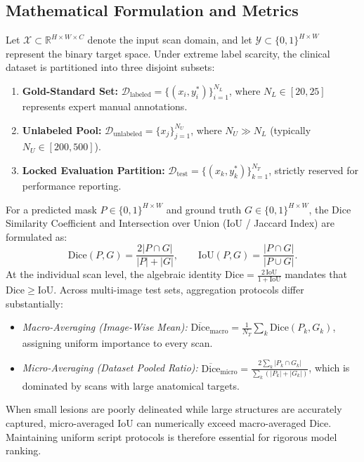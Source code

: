 \documentclass[journal,11pt,onecolumn,draftclsnofoot]{IEEEtran}
\begin{document}
\subsection{Mathematical Formulation and Metrics}
\label{subsec:metrics}
Let $\mathcal{X} \subset \mathbb{R}^{H \times W \times C}$ denote the input scan domain, and let $\mathcal{Y} \subset \{0, 1\}^{H \times W}$ represent the binary target space. Under extreme label scarcity, the clinical dataset is partitioned into three disjoint subsets:
\begin{enumerate}
    \item \textbf{Gold-Standard Set:} $\mathcal{D}_{\text{labeled}} = \{(x_i, y_i^*)\}_{i=1}^{N_L}$, where $N_L \in [20, 25]$ represents expert manual annotations.
    \item \textbf{Unlabeled Pool:} $\mathcal{D}_{\text{unlabeled}} = \{x_j\}_{j=1}^{N_U}$, where $N_U \gg N_L$ (typically $N_U \in [200, 500]$).
    \item \textbf{Locked Evaluation Partition:} $\mathcal{D}_{\text{test}} = \{(x_k, y_k^*)\}_{k=1}^{N_T}$, strictly reserved for performance reporting.
\end{enumerate}

For a predicted mask $P \in \{0, 1\}^{H \times W}$ and ground truth $G \in \{0, 1\}^{H \times W}$, the Dice Similarity Coefficient and Intersection over Union (IoU / Jaccard Index) are formulated as:
\begin{equation}
\mathrm{Dice}(P, G) = \frac{2|P \cap G|}{|P| + |G|}, \qquad \mathrm{IoU}(P, G) = \frac{|P \cap G|}{|P \cup G|}.
\label{eq:metrics}
\end{equation}
At the individual scan level, the algebraic identity $\mathrm{Dice} = \frac{2\,\mathrm{IoU}}{1+\mathrm{IoU}}$ mandates that $\mathrm{Dice} \ge \mathrm{IoU}$. Across multi-image test sets, aggregation protocols differ substantially:
\begin{itemize}
    \item \emph{Macro-Averaging (Image-Wise Mean):} $\overline{\mathrm{Dice}}_{\text{macro}} = \frac{1}{N_T}\sum_k \mathrm{Dice}(P_k, G_k)$, assigning uniform importance to every scan.
    \item \emph{Micro-Averaging (Dataset Pooled Ratio):} $\overline{\mathrm{Dice}}_{\text{micro}} = \frac{2\sum_k |P_k \cap G_k|}{\sum_k (|P_k| + |G_k|)}$, which is dominated by scans with large anatomical targets.
\end{itemize}
When small lesions are poorly delineated while large structures are accurately captured, micro-averaged IoU can numerically exceed macro-averaged Dice. Maintaining uniform script protocols is therefore essential for rigorous model ranking.
\end{document}
